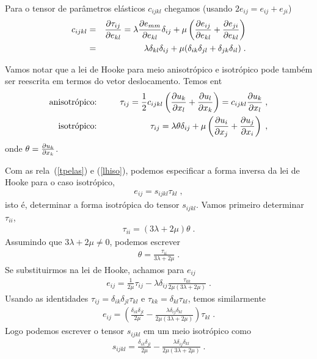 Para o tensor de par\^ametros el\'asticos $c_{ijkl}$
chegamos (usando $2e_{ij} = e_{ij} + e_{ji}$)
\begin{eqnarray} \label{tpelas}
c_{ijkl} &=& \frac{\partial \tau_{ij}}{\partial e_{kl}} = \lambda
\frac{\partial e_{mm}}{\partial e_{kl}} \delta_{ij} + \mu \left(
\frac{\partial e_{ij}}{\partial e_{kl}} + \frac{\partial e_{ji}}{\partial e_{kl}}
\right) \nonumber \\
&=& \lambda \delta_{kl} \delta_{ij} + \mu (\delta_{ik}
\delta_{jl} + \delta_{jk} \delta_{il}) \; .
\end{eqnarray}

Vamos notar que a lei de Hooke para meio anisotr\'opico
e isotr\'opico pode tamb\'em ser reescrita em termos do
vetor deslocamento. Temos ent\ao
\begin{eqnarray}
\mbox{anisotr\'opico:} &\hspace{0.6cm}& \tau_{ij}=\frac{1}{2}
c_{ijkl} \left( \frac{\partial u_k}{\partial x_l} + \frac{\partial u_l}{\partial x_k}\right)
= c_{ijkl}\frac{\partial u_k}{\partial x_l} \; , \label{lhanis} \\
\mbox{isotr\'opico:} &\hspace{0.6cm}& \tau_{ij} = 
\lambda \theta \delta_{ij} + \mu \left( \frac{\partial u_i}{\partial x_j} +
\frac{\partial u_j}{\partial x_i} \right) \; , \label{lhiso}
\end{eqnarray} 
onde $\theta = \frac{\partial u_k}{\partial x_k}$.

Com as rela\coes\ (\ref{tpelas}) e (\ref{lhiso}), podemos
especificar a forma inversa da lei de Hooke para o caso
isotr\'opico,
\begin{eqnarray}
e_{ij} = s_{ijkl}\tau_{kl} \; ,
\end{eqnarray}
isto \'e, determinar a forma isotr\'opica do tensor
$s_{ijkl}$. Vamos primeiro determinar $\tau_{ii}$,
\begin{eqnarray}
\tau_{ii} = (3\lambda + 2\mu) \theta \; .
\end{eqnarray}
Assumindo que $3\lambda + 2\mu \neq 0$, podemos escrever
\begin{eqnarray}
\theta = \frac{\tau_{ii}}{3\lambda + 2\mu} \; .
\end{eqnarray} 
Se substituirmos na lei de Hooke, achamos para $e_{ij}$
\begin{eqnarray}
e_{ij} = \frac{1}{2\mu} \tau_{ij} - \lambda \delta_{ij}
\frac{\tau_{kk}}{2\mu(3\lambda + 2\mu)} \; .
\end{eqnarray}
Usando as identidades $\tau_{ij} = \delta_{ik}\delta_{jl}
\tau_{kl}$ e $\tau_{kk}=\delta_{kl} \tau_{kl}$, temos
similarmente
\begin{eqnarray}
e_{ij} = \left( \frac{\delta_{ik}\delta_{jl}}{2\mu} -
\frac{\lambda \delta_{ij} \delta_{kl}}{2\mu(3\lambda +
2\mu)} \right) \tau_{kl} \; .
\end{eqnarray}
Logo podemos escrever o tensor $s_{ijkl}$ em um meio isotr\'opico como
\begin{eqnarray}
s_{ijkl} = \frac{\delta_{ik}\delta_{jl}}{2\mu} -
\frac{\lambda \delta_{ij} \delta_{kl}}{2\mu(3\lambda +
2\mu)} \; .
\end{eqnarray}


